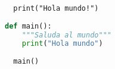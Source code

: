 \usepackage{listings}
\usepackage{color}




\begin{lstlisting}
  print("Hola mundo!")
\end{lstlisting}

\begin{lstlisting}[language=Python]
  def main():
    """Saluda al mundo"""
    print("Hola mundo")
  
  main()
\end{lstlisting}







